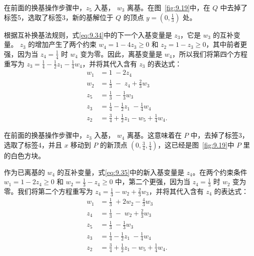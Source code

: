 在前面的换基操作步骤中，\({z}_{5}\) 入基， \({w}_{3}\) 离基。在图~\ref{fig:9.19}中，在 \(Q\) 中去掉了标签5，选取了标签3，新的基解位于 \(Q\) 的顶点 \(y = \left( {0,\frac{1}{3}}\right)\) 处。

根据互补换基法规则，式\eqref{eq:9.34}中的下一个入基变量是 \({z}_{3}\)，它是 \({w}_{3}\) 的互补变量。 \({z}_{3}\) 的增加产生了两个约束 \({w}_{4} = 1 - 4{z}_{3} \geq  0\) 和 \({z}_{2} = 1 - {z}_{3} \geq  0\)，其中前者更强，因为当 \({z}_{4} = \frac{1}{4}\) 时 \({w}_{4}\) 变为零。因此，离基变量是 \({w}_{4}\)，所以我们将第四个方程重写为 \({z}_{3} = \frac{1}{4} - \frac{1}{2}{z}_{1} - \frac{1}{4}{w}_{4}\)，并将其代入含有 \({z}_{3}\) 的表达式：
\begin{equation}
\label{eq:9.35}
\begin{aligned}
{w}_{1} & = 1\; - 2{z}_{4} \\
{w}_{2} & = \frac{1}{3}\; - \;{z}_{4} + \frac{2}{3}{w}_{3}\\
{z}_{5} & = \frac{1}{3}\; - \frac{1}{3}{w}_{3}\\
{z}_{3} & = \frac{1}{4} - \frac{1}{2}{z}_{1}\; - \frac{1}{4}{w}_{4}  \\
{z}_{2} & = \frac{3}{4} + \frac{1}{2}{z}_{1} - {w}_{5} + \frac{1}{4}{w}_{4}.
\end{aligned}
\end{equation}


在前面的换基操作步骤中，\({z}_{3}\) 入基， \({w}_{4}\) 离基。这意味着在 \(P\) 中，去掉了标签3，选取了标签4，并且 \(x\) 移动到 \(P\) 的新顶点 \(\left( {0,\frac{3}{4},\frac{1}{4}}\right)\)，这已经是图~\ref{fig:9.19}中 \(P\) 里的白色方块。

作为已离基的 \({w}_{4}\) 的互补变量，式\eqref{eq:9.35}中的新入基变量是 \({z}_{4}\)。在两个约束条件 \({w}_{1} = 1 - 2{z}_{4} \geq  0\) 和 \({w}_{2} = \frac{1}{3} - {z}_{4} \geq  0\) 中，第二个更强，因为当 \({z}_{4} = \frac{1}{3}\) 时 \({w}_{2}\) 变为零。我们将第二个方程重写为 \({z}_{4} = \frac{1}{3} - {w}_{2} + \frac{2}{3}{w}_{3}\)，并将其代入含有 \({z}_{4}\) 的表达式：
\begin{equation}
\label{eq:9.36}
\begin{aligned}
{w}_{1} & = \frac{1}{3}\; + 2{w}_{2} - \frac{4}{3}{w}_{3}  \\
{z}_{4} & = \frac{1}{3}\; - \;{w}_{2} + \frac{2}{3}{w}_{3}  \\
{z}_{5} & = \frac{1}{3}\; - \frac{1}{3}{w}_{3}  \\
{z}_{3} & = \frac{1}{4} - \frac{1}{2}{z}_{1}\; - \frac{1}{4}{w}_{4} \\
{z}_{2} & = \frac{3}{4} + \frac{1}{2}{z}_{1} - {w}_{5} + \frac{1}{4}{w}_{4}.
\end{aligned}
\end{equation}

